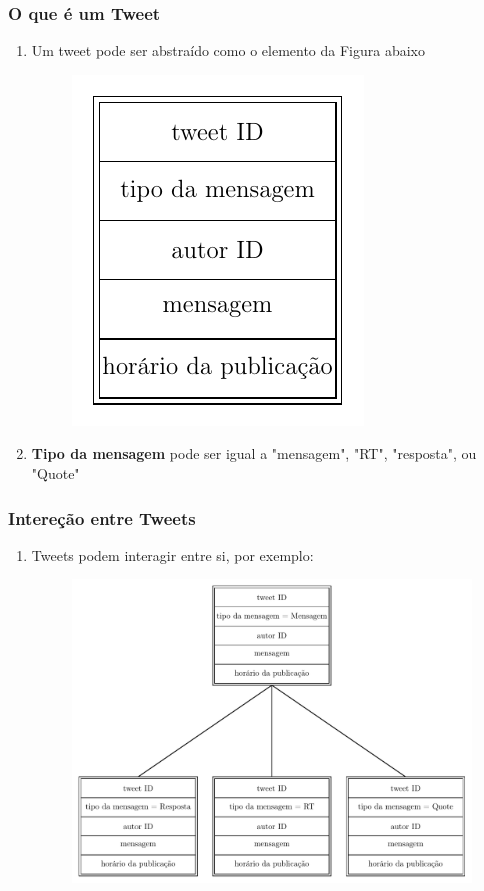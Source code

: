 \documentclass[11pt]{beamer}
\theoremstyle{remark}
\theoremstyle{definition}
\theoremstyle{plain}
\begin{document}
	\begin{frame}
		\frametitle{O que é um Tweet}
		\begin{enumerate}
			\item Um tweet pode ser abstraído como o elemento da Figura abaixo
			\begin{figure}[h]
				\centering
				\includegraphics{pics/pic0.pdf}
			\end{figure}
			\item \textbf{Tipo da mensagem} pode ser igual a "mensagem", "RT", "resposta", ou "Quote"
		\end{enumerate}
		\end{frame}

	\begin{frame}
		\frametitle{Intereção entre Tweets}
		\begin{enumerate}
			\item Tweets podem interagir entre si, por exemplo:
			\begin{figure}[h]
				\centering
				\includegraphics[scale=0.45]{pics/pic1.pdf}
			\end{figure}
		\end{enumerate}
		\end{frame}
\end{document}
